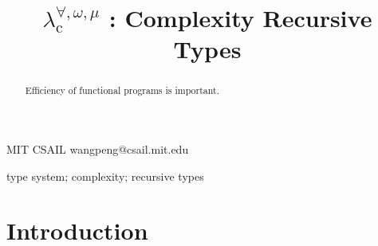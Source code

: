 \documentclass[preprint]{sigplanconf}
\newcommand{\logo}{\lambda^{\forall,\omega,\mu}_\mathrm{c}}
\begin{document}
\setlength{\pdfpageheight}{\paperheight}
\setlength{\pdfpagewidth}{\paperwidth}






\title{$\logo$ : Complexity Recursive Types}

           {MIT CSAIL}
           {wangpeng@csail.mit.edu}

\maketitle

\begin{abstract}
Efficiency of functional programs is important.
\end{abstract}



\keywords
type system; complexity; recursive types

\section{Introduction}
\end{document}
